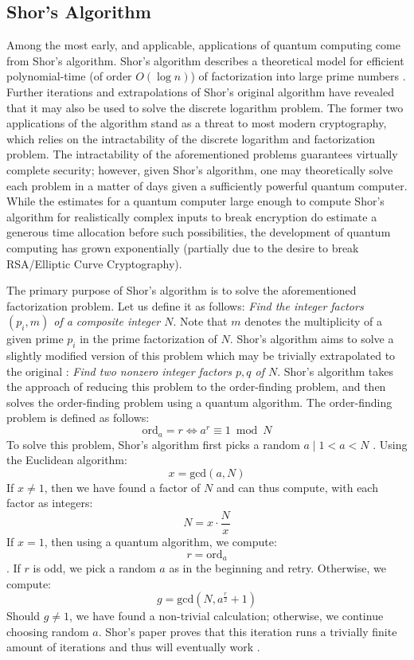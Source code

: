 \documentclass[12pt]{article}
\begin{document}
\subsection{Shor's Algorithm}
Among the most early, and applicable, applications of quantum computing come from Shor's algorithm. 
Shor's algorithm describes a theoretical model for efficient polynomial-time (of order $O(\log{n})$) of factorization into large prime numbers \autocite{shor_polynomial-time_1997}.
Further iterations and extrapolations of Shor's original algorithm have revealed that it may also be used to solve the discrete logarithm problem. 
The former two applications of the algorithm stand as a threat to most modern cryptography, which relies on the intractability of the discrete logarithm and factorization problem. 
The intractability of the aforementioned problems guarantees virtually complete security; however, given Shor's algorithm, one may theoretically solve each problem in a matter of days given a sufficiently powerful quantum computer. 
While the estimates for a quantum computer large enough to compute Shor's algorithm for realistically complex inputs to break encryption do estimate a generous time allocation before such possibilities, the development of quantum computing has grown exponentially (partially due to the desire to break RSA/Elliptic Curve Cryptography).

The primary purpose of Shor's algorithm is to solve the aforementioned factorization problem. Let us define it as follows: 
\emph{Find the integer factors $(p_i, m)$ of a composite integer $N$}. 
Note that $m$ denotes the multiplicity of a given prime $p_i$ in the prime factorization of $N$. 
Shor's algorithm aims to solve a slightly modified version of this problem which may be trivially extrapolated to the original \autocite{shor_polynomial-time_1997}: 
\emph{Find two nonzero integer factors $p, q$ of $N$}.
Shor's algorithm takes the approach of reducing this problem to the order-finding problem, and then solves the order-finding problem using a quantum algorithm. 
The order-finding problem is defined as follows: 
$$ \text{ord}_a = r \iff a^r \equiv 1 \bmod{N}$$
To solve this problem, Shor's algorithm first picks a random $a \mid 1 < a < N$ \autocite{lam_cryptography_2001}. 
Using the Euclidean algorithm:
$$ x = \text{gcd}(a, N)$$
If $x \neq 1$, then we have found a factor of $N$ and can thus compute, with each factor as integers:  
$$N = x \cdot \frac{N}{x}$$ 
If $x = 1$, then using a quantum algorithm, we compute: 
$$r = \text{ord}_a$$. 
If $r$ is odd, we pick a random $a$ as in the beginning and retry.
Otherwise, we compute: 
$$ g = \text{gcd}(N, a^{\frac{r}{2}} + 1)$$
Should $g \neq 1$, we have found a non-trivial calculation; otherwise, we continue choosing random $a$. 
Shor's paper proves that this iteration runs a trivially finite amount of iterations and thus will eventually work \autocite{shor_polynomial-time_1997}. 
\end{document}
